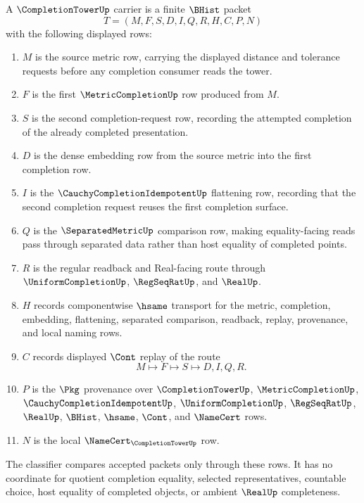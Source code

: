 \begin{definition}
\label{def:completion-tower-carrier}
A $\CompletionTowerUp$ carrier is a finite $\BHist$ packet
$$
T=(M,F,S,D,I,Q,R,H,C,P,N)
$$
with the following displayed rows:
\begin{enumerate}
\item $M$ is the source metric row, carrying the displayed distance and tolerance requests before any completion consumer reads the tower.
\item $F$ is the first $\MetricCompletionUp$ row produced from $M$.
\item $S$ is the second completion-request row, recording the attempted completion of the already completed presentation.
\item $D$ is the dense embedding row from the source metric into the first completion row.
\item $I$ is the $\CauchyCompletionIdempotentUp$ flattening row, recording that the second completion request reuses the first completion surface.
\item $Q$ is the $\SeparatedMetricUp$ comparison row, making equality-facing reads pass through separated data rather than host equality of completed points.
\item $R$ is the regular readback and Real-facing route through $\UniformCompletionUp$, $\RegSeqRatUp$, and $\RealUp$.
\item $H$ records componentwise $\hsame$ transport for the metric, completion, embedding, flattening, separated comparison, readback, replay, provenance, and local naming rows.
\item $C$ records displayed $\Cont$ replay of the route
$$
M \longmapsto F \longmapsto S \longmapsto D,I,Q,R .
$$
\item $P$ is the $\Pkg$ provenance over $\CompletionTowerUp$, $\MetricCompletionUp$, $\CauchyCompletionIdempotentUp$, $\UniformCompletionUp$, $\RegSeqRatUp$, $\RealUp$, $\BHist$, $\hsame$, $\Cont$, and $\NameCert$ rows.
\item $N$ is the local $\NameCert_{\CompletionTowerUp}$ row.
\end{enumerate}
The classifier compares accepted packets only through these rows. It has no coordinate for quotient completion equality, selected representatives, countable choice, host equality of completed objects, or ambient $\RealUp$ completeness.
\end{definition}

